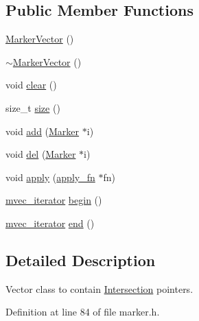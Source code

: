 \subsection*{Public Member Functions}
\begin{DoxyCompactItemize}
\item 
\hyperlink{classShipCAD_1_1MarkerVector_ac7ced9a20366d5975cd5ce96bc3f0c6a}{Marker\-Vector} ()
\item 
\hyperlink{classShipCAD_1_1MarkerVector_a2f322ec966c4d1e4f13181e2525ab415}{$\sim$\-Marker\-Vector} ()
\item 
void \hyperlink{classShipCAD_1_1MarkerVector_ab79087d8e978267b06ca675e03ecf115}{clear} ()
\item 
size\-\_\-t \hyperlink{classShipCAD_1_1MarkerVector_a9b9cfe1d2e6fd99dcc9065328379caa0}{size} ()
\item 
void \hyperlink{classShipCAD_1_1MarkerVector_a08fb22690149beded7689a53f5dd57c8}{add} (\hyperlink{classShipCAD_1_1Marker}{Marker} $\ast$i)
\item 
void \hyperlink{classShipCAD_1_1MarkerVector_a944398b298cc7c42e30e14b263000629}{del} (\hyperlink{classShipCAD_1_1Marker}{Marker} $\ast$i)
\item 
void \hyperlink{classShipCAD_1_1MarkerVector_a595a4606a67df7e1754db3aab428c27c}{apply} (\hyperlink{classShipCAD_1_1MarkerVector_a9b5bd2154a62bceb3e4a0bb648fb297b}{apply\-\_\-fn} $\ast$fn)
\item 
\hyperlink{classShipCAD_1_1MarkerVector_a15ac0550091a081f0ef20c3f0b03693b}{mvec\-\_\-iterator} \hyperlink{classShipCAD_1_1MarkerVector_a87a3511e7920311ae12b9fad52c2365d}{begin} ()
\item 
\hyperlink{classShipCAD_1_1MarkerVector_a15ac0550091a081f0ef20c3f0b03693b}{mvec\-\_\-iterator} \hyperlink{classShipCAD_1_1MarkerVector_a6a47ae7aab386d549b67191b5cf4c890}{end} ()
\end{DoxyCompactItemize}


\subsection{Detailed Description}
Vector class to contain \hyperlink{classShipCAD_1_1Intersection}{Intersection} pointers. 



Definition at line 84 of file marker.\-h.



